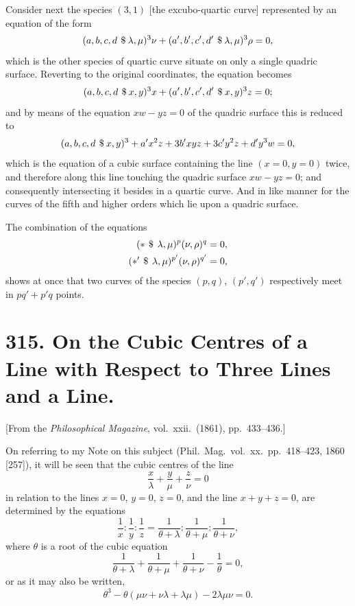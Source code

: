 \documentclass[11pt,a4paper]{article}
\theoremstyle{plain}
\begin{document}
Consider next the species $(3, 1)$ [the excubo-quartic curve] represented by an equation of the form
\[
(a, b, c, d \, \mathbin{\char`\$} \lambda, \mu)^3 \nu + (a', b', c', d' \, \mathbin{\char`\$} \lambda, \mu)^3 \rho = 0,
\]
which is the other species of quartic curve situate on only a single quadric surface. Reverting to the original coordinates, the equation becomes
\[
(a, b, c, d \, \mathbin{\char`\$} x, y)^3 x + (a', b', c', d' \, \mathbin{\char`\$} x, y)^3 z = 0;
\]
and by means of the equation $xw - yz = 0$ of the quadric surface this is reduced to
\[
(a, b, c, d \, \mathbin{\char`\$} x, y)^3 + a'x^2z + 3b'xyz + 3c'y^2z + d'y^3w = 0,
\]
which is the equation of a cubic surface containing the line $(x = 0, y = 0)$ twice, and therefore along this line touching the quadric surface $xw - yz = 0$; and consequently intersecting it besides in a quartic curve. And in like manner for the curves of the fifth and higher orders which lie upon a quadric surface.

The combination of the equations
\begin{align*}
(* \, \mathbin{\char`\$} \, \lambda, \mu)^p (\nu, \rho)^q &= 0, \\
(*' \, \mathbin{\char`\$} \, \lambda, \mu)^{p'} (\nu, \rho)^{q'} &= 0,
\end{align*}
shows at once that two curves of the species $(p, q)$, $(p', q')$ respectively meet in $pq' + p'q$ points.


\newpage
\section*{315. On the Cubic Centres of a Line with Respect to Three Lines and a Line.}

[From the \textit{Philosophical Magazine}, vol.\ xxii.\ (1861), pp.\ 433--436.]

\medskip

On referring to my Note on this subject (Phil.\ Mag.\ vol.\ xx.\ pp.\ 418--423, 1860 [257]), it will be seen that the cubic centres of the line
\[
\frac{x}{\lambda} + \frac{y}{\mu} + \frac{z}{\nu} = 0
\]
in relation to the lines $x = 0$, $y = 0$, $z = 0$, and the line $x + y + z = 0$, are determined by the equations
\[
\frac{1}{x} : \frac{1}{y} : \frac{1}{z} = \frac{1}{\theta + \lambda} : \frac{1}{\theta + \mu} : \frac{1}{\theta + \nu},
\]
where $\theta$ is a root of the cubic equation
\[
\frac{1}{\theta + \lambda} + \frac{1}{\theta + \mu} + \frac{1}{\theta + \nu} - \frac{1}{\theta} = 0,
\]
or as it may also be written,
\[
\theta^3 - \theta(\mu\nu + \nu\lambda + \lambda\mu) - 2\lambda\mu\nu = 0.
\]
\end{document}
